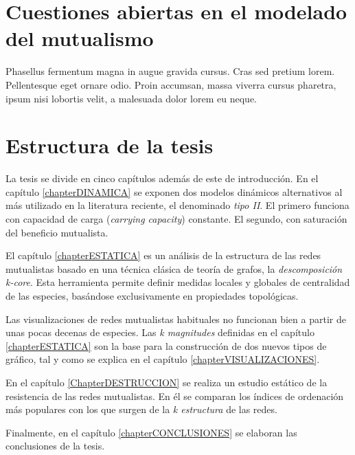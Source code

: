 \section{Cuestiones abiertas en el modelado del mutualismo}

Phasellus fermentum magna in augue gravida cursus. Cras sed pretium lorem. Pellentesque eget ornare odio. Proin accumsan, massa viverra cursus pharetra, ipsum nisi lobortis velit, a malesuada dolor lorem eu neque.


\section{Estructura de la tesis}

La tesis se divide en cinco capítulos además de este de introducción. En el capítulo \ref{chapterDINAMICA} se exponen dos modelos dinámicos alternativos al más utilizado en la literatura reciente, el denominado \textit{tipo II}. El primero funciona con capacidad de carga (\textit{carrying capacity}) constante. El segundo, con saturación del beneficio mutualista.

El capítulo \ref{chapterESTATICA} es un análisis de la estructura de las redes mutualistas basado en una técnica clásica de teoría de grafos, la \textit{descomposición k-core}. Esta herramienta permite definir medidas locales y globales de centralidad de las especies, basándose exclusivamente en propiedades topológicas.

Las visualizaciones de redes mutualistas habituales no funcionan bien a partir de unas pocas decenas de especies. Las \textit{k magnitudes} definidas  en el capítulo \ref{chapterESTATICA} son la base para la construcción de dos nuevos tipos de gráfico, tal y como se explica en el capítulo \ref{chapterVISUALIZACIONES}.

En el capítulo \ref{ChapterDESTRUCCION} se realiza un estudio estático de la resistencia de las redes mutualistas. En él se comparan los índices de ordenación más populares con los que surgen de la \textit{k estructura} de las redes.

Finalmente, en el capítulo \ref{chapterCONCLUSIONES} se elaboran las conclusiones de la tesis.

